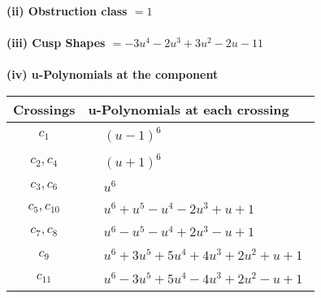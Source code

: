 \documentclass[1p]{elsarticle_modified}
\theoremstyle{definition}
\begin{document}
\flushleft \textbf{(ii) Obstruction class $= 1$}\\~\\
\flushleft \textbf{(iii) Cusp Shapes $= -3 u^4-2 u^3+3 u^2-2 u-11$}\\~\\
\newpage\renewcommand{\arraystretch}{1}
\flushleft \textbf{(iv) u-Polynomials at the component}\newline \\
\begin{tabular}{m{50pt}|m{274pt}}
Crossings & \hspace{64pt}u-Polynomials at each crossing \\
\hline $$\begin{aligned}c_{1}\end{aligned}$$&$\begin{aligned}
&(u-1)^6
\end{aligned}$\\
\hline $$\begin{aligned}c_{2},c_{4}\end{aligned}$$&$\begin{aligned}
&(u+1)^6
\end{aligned}$\\
\hline $$\begin{aligned}c_{3},c_{6}\end{aligned}$$&$\begin{aligned}
&u^6
\end{aligned}$\\
\hline $$\begin{aligned}c_{5},c_{10}\end{aligned}$$&$\begin{aligned}
&u^6+u^5- u^4-2 u^3+u+1
\end{aligned}$\\
\hline $$\begin{aligned}c_{7},c_{8}\end{aligned}$$&$\begin{aligned}
&u^6- u^5- u^4+2 u^3- u+1
\end{aligned}$\\
\hline $$\begin{aligned}c_{9}\end{aligned}$$&$\begin{aligned}
&u^6+3 u^5+5 u^4+4 u^3+2 u^2+u+1
\end{aligned}$\\
\hline $$\begin{aligned}c_{11}\end{aligned}$$&$\begin{aligned}
&u^6-3 u^5+5 u^4-4 u^3+2 u^2- u+1
\end{aligned}$\\
\hline
\end{tabular}\\~\\
\end{document}
